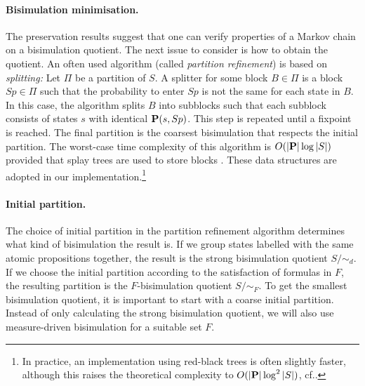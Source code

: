 \documentclass{llncs}
\begin{document}

\paragraph{Bisimulation minimisation.}
        The preservation results suggest that one can verify properties of a Markov chain
        on a bisimulation quotient.
        The next issue to consider is how to obtain the quotient.
        An often used algorithm (called \emph{partition refinement}) is based on \emph{splitting:}
        Let $\Pi$ be a partition of $S$.
        A splitter for some block $B \in \Pi$ is a block $Sp \in \Pi$
        such that the probability to enter $Sp$ is not the same for each state in $B$.
        In this case, the algorithm splits $B$ into subblocks
        such that each subblock consists of states $s$ with identical $\mathbf{P}(s,Sp)$.
        This step is repeated until a fixpoint is reached.
        The final partition is the coarsest bisimulation that respects the initial partition.
        The worst-case time complexity of this algorithm is $O(|\mathbf{P}| \log |S|)$ provided
        that splay trees are used to store blocks \cite{DerisaviHS_IPL03}.
        These data structures are adopted in our implementation.\footnote{
                In practice, an implementation using red-black trees is often slightly faster,
                although this raises the theoretical complexity to 
                $O(|\mathbf{P}| \log^2 |S|)$, cf.\@ \cite[Section~3.4]{Derisavi_PhD05}.}

\paragraph{Initial partition.}
        The choice of initial partition in the partition refinement algorithm
        determines what kind of bisimulation the result is.
        If we group states labelled with the same atomic propositions together,
        the result is the strong bisimulation quotient $S/\mathord{\sim}_d$.
        If we choose the initial partition according to the satisfaction of formulas in $F$,
        the resulting partition is the $F$-bisimulation quotient $S/\mathord{\sim}_F$.
        To get the smallest bisimulation quotient,
        it is important to start with a coarse initial partition.
        Instead of only calculating the strong bisimulation quotient,
        we will also use measure-driven bisimulation for a suitable set $F$.
\end{document}
